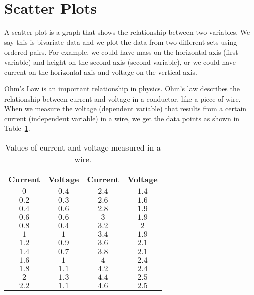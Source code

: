 \section{Scatter Plots}
\label{ms:sp}


A scatter-plot is a graph that shows the relationship between two variables. We say this is bivariate data and we plot the data from two different sets using ordered pairs. For example, we could have mass on the horizontal axis (first variable) and height on the second axis (second variable), or we could have current on the horizontal axis and voltage on the vertical axis.

Ohm's Law is an important relationship in physics. Ohm's law describes the relationship between current and voltage in a conductor, like a piece of wire. When we measure the voltage (dependent variable) that results from a certain current (independent variable) in a wire, we get the data points as shown in Table~\ref{tab:ms:sp:ohm}.

\begin{table}[!ht]
\begin{center}
\caption{Values of current and voltage measured in a wire.}
\begin{tabular}{|c|c||c|c|}\hline
\textbf{Current} & \textbf{Voltage} & \textbf{Current} & \textbf{Voltage} \\\hline\hline
$0$ & $0.4$ & $2.4$ & $1.4$ \\\hline
$0.2$ & $0.3$ & $2.6$ & $1.6$ \\\hline
$0.4$ & $0.6$ & $2.8$ & $1.9$ \\\hline
$0.6$ & $0.6$ & $3$ & $1.9$ \\\hline
$0.8$ & $0.4$ & $3.2$ & $2$ \\\hline
$1$ & $1$ & $3.4$ & $1.9$ \\\hline
$1.2$ & $0.9$ & $3.6$ & $2.1$ \\\hline
$1.4 $& $0.7$ & $3.8$ & $2.1$ \\\hline
$1.6 $& $1$ & $4$ & $2.4$ \\\hline
$1.8$ & $1.1$ & $4.2$ & $2.4$ \\\hline
$2$ & $1.3$ & $4.4$ & $2.5$ \\\hline
$2.2$ & $1.1$ & $4.6$ & $2.5$ \\\hline
\end{tabular}
\label{tab:ms:sp:ohm}
\end{center}
\end{table}

